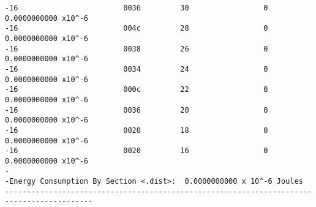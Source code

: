 \begin{verbatim}
-16                        0036         30                 0              0.0000000000 x10^-6 
-16                        004c         28                 0              0.0000000000 x10^-6 
-16                        0038         26                 0              0.0000000000 x10^-6 
-16                        0034         24                 0              0.0000000000 x10^-6 
-16                        000c         22                 0              0.0000000000 x10^-6 
-16                        0036         20                 0              0.0000000000 x10^-6 
-16                        0020         18                 0              0.0000000000 x10^-6 
-16                        0020         16                 0              0.0000000000 x10^-6 
-                                                                                          
-Energy Consumption By Section <.dist>:  0.0000000000 x 10^-6 Joules
------------------------------------------------------------------------------------------
\end{verbatim}





















